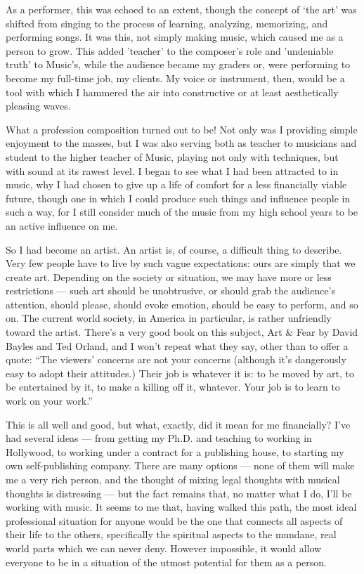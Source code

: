 \documentclass{book}
\begin{document}
As a performer, this was echoed to an extent, though the concept of `the art' was shifted from singing to the process of learning, analyzing, memorizing, and performing songs.  It was this, not simply making music, which caused me as a person to grow.  This added 'teacher' to the composer's role and 'undeniable truth' to Music's, while the audience became my graders or, were performing to become my full-time job, my clients.  My voice or instrument, then, would be a tool with which I hammered the air into constructive or at least aesthetically pleasing waves.

What a profession composition turned out to be! Not only was I providing simple enjoyment to the masses, but I was also serving both as teacher to musicians and student to the higher teacher of Music, playing not only with techniques, but with sound at its rawest level.  I began to see what I had been attracted to in music, why I had chosen to give up a life of comfort for a less financially viable future, though one in which I could produce such things and influence people in such a way, for I still consider much of the music from my high school years to be an active influence on me.

So I had become an artist.  An artist is, of course, a difficult thing to describe.  Very few people have to live by such vague expectations: ours are simply that we create art.  Depending on the society or situation, we may have more or less restrictions --- such art should be unobtrusive, or should grab the audience's attention, should please, should evoke emotion, should be easy to perform, and so on.  The current world society, in America in particular, is rather unfriendly toward the artist.  There's a very good book on this subject, Art \& Fear by David Bayles and Ted Orland, and I won't repeat what they say, other than to offer a quote: ``The viewers' concerns are not your concerns (although it's dangerously easy to adopt their attitudes.) Their job is whatever it is: to be moved by art, to be entertained by it, to make a killing off it, whatever.  Your job is to learn to work on your work.''

This is all well and good, but what, exactly, did it mean for me financially? I've had several ideas --- from getting my Ph.D.  and teaching to working in Hollywood, to working under a contract for a publishing house, to starting my own self-publishing company.  There are many options --- none of them will make me a very rich person, and the thought of mixing legal thoughts with musical thoughts is distressing --- but the fact remains that, no matter what I do, I'll be working with music.  It seems to me that, having walked this path, the most ideal professional situation for anyone would be the one that connects all aspects of their life to the others, specifically the spiritual aspects to the mundane, real world parts which we can never deny.  However impossible, it would allow everyone to be in a situation of the utmost potential for them as a person.
\end{document}
